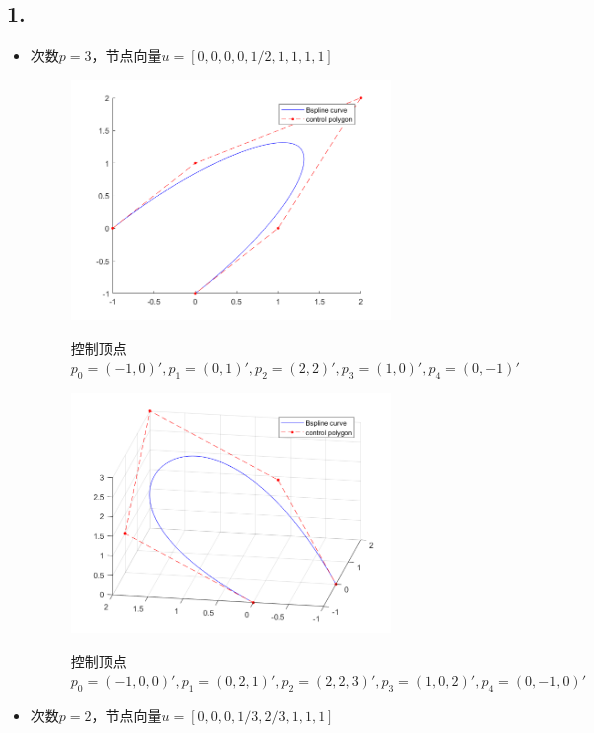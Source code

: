 \documentclass[utf8]{ctexart}
\begin{document}
\subsection*{1.}
\begin{itemize}
    \item 次数$p=3$，节点向量$u = [0, 0, 0, 0, 1/2, 1, 1, 1, 1]$
    \begin{figure}[H]
        \centering
        \includegraphics[width=0.8\textwidth]{bspline_2d_1.png}
        \label{fig: bspline_2d_1}
        \caption{控制顶点
        $p_0=(-1,0)', p_1=(0,1)', p_2=(2,2)', p_3=(1,0)', p_4=(0,-1)'$}
    \end{figure}
    \begin{figure}[H]
        \centering
        \includegraphics[width=0.8\textwidth]{bspline_3d_1.png}
        \label{fig: bspline_3d_1}
        \caption{控制顶点
        $p_0=(-1,0,0)', p_1=(0,2,1)', p_2=(2,2,3)', p_3=(1,0,2)', p_4=(0,-1,0)'$}
    \end{figure}
    \item 次数$p=2$，节点向量$u = [0, 0, 0, 1/3, 2/3, 1, 1, 1]$

\end{itemize}
\end{document}
